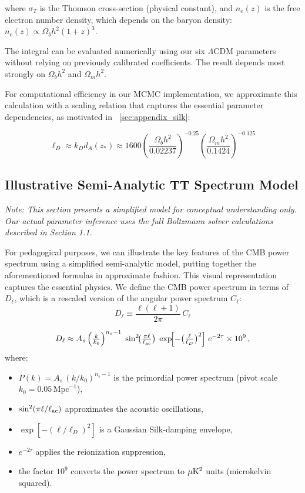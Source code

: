 \documentclass[11pt]{article}
\theoremstyle{definition}
\begin{document}
where $\sigma_T$ is the Thomson cross-section (physical constant), and $n_e(z)$ is the free electron number density, which depends on the baryon density: $n_e(z) \propto \Omega_b h^2 (1+z)^3$.

The integral can be evaluated numerically using our six $\Lambda$CDM parameters without relying on previously calibrated coefficients. The result depends most strongly on $\Omega_b h^2$ and $\Omega_m h^2$.

For computational efficiency in our MCMC implementation, we approximate this calculation with a scaling relation that captures the essential parameter dependencies, as motivated in ~\ref{sec:appendix_silk}:

\begin{equation}
\ell_D \approx k_D d_A(z_*) \approx 1600 \left(\frac{\Omega_b h^2}{0.02237}\right)^{-0.25} \left(\frac{\Omega_m h^2}{0.1424}\right)^{-0.125}
\end{equation}


\subsection{Illustrative Semi‑Analytic TT Spectrum Model}
\textit{Note: This section presents a simplified model for conceptual understanding only. Our actual parameter inference uses the full Boltzmann solver calculations described in Section 1.1.}

For pedagogical purposes, we can illustrate the key features of the CMB power spectrum using a simplified semi-analytic model, putting together the aforementioned formulas in approximate fashion. This visual representation captures the essential physics. We define the CMB power spectrum in terms of $D_{\ell}$, which is a rescaled version of the angular power spectrum $C_{\ell}$:
\[
D_\ell \equiv \frac{\ell(\ell+1)}{2\pi}\,C_\ell
\]


\[
D_\ell \approx A_s \,\Bigl(\tfrac{k}{k_0}\Bigr)^{n_s-1}
\;\sin^2\!\bigl(\tfrac{\pi\ell}{\ell_{\rm ac}}\bigr)
\;\exp\!\Bigl[-\bigl(\tfrac{\ell}{\ell_D}\bigr)^2\Bigr]
\;e^{-2\tau}\times10^{9}\,,
\]
where:
\begin{itemize}
  \item $P(k)=A_s\,(k/k_0)^{n_s-1}$ is the primordial power spectrum (pivot scale $k_0=0.05\,\mathrm{Mpc}^{-1}$),
  \item $\sin^2(\pi\ell/\ell_{\rm ac})$ approximates the acoustic oscillations,
  \item $\exp[-(\ell/\ell_D)^2]$ is a Gaussian Silk‑damping envelope,
  \item $e^{-2\tau}$ applies the reionization suppression,
  \item the factor $10^9$ converts the power spectrum to $\mu{\rm K}^2$ units (microkelvin squared).
\end{itemize}
\end{document}
